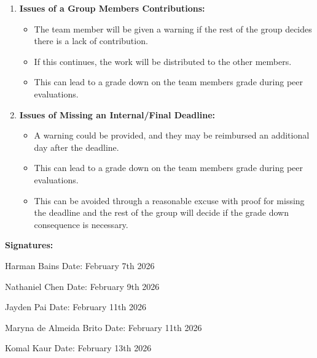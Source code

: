 \documentclass[10pt,letterpaper]{article}
\begin{document}
\begin{enumerate}
\item \textbf{Issues of a Group Members Contributions:}
      \begin{itemize}[leftmargin=*]
      \item The team member will be given a warning if the rest of the group decides there is a lack of contribution.
      \item If this continues, the work will be distributed to the other members.
      \item This can lead to a grade down on the team members grade during peer evaluations.
      \end{itemize}

\item \textbf{Issues of Missing an Internal/Final Deadline:}
      \begin{itemize}[leftmargin=*]
      \item A warning could be provided, and they may be reimbursed an additional day after the deadline.
      \item This can lead to a grade down on the team members grade during peer evaluations.
      \item This can be avoided through a reasonable excuse with proof for missing the deadline and the rest of the group will decide if the grade down consequence is necessary.
      \end{itemize}

\end{enumerate}

\vspace{1em}


\textbf{Signatures:}

\vspace{0em}

Harman Bains \hrulefill \quad Date: February 7th 2026 \hrulefill

\vspace{0em}

Nathaniel Chen \hrulefill \quad Date: February 9th 2026 \hrulefill

\vspace{0em}

Jayden Pai \hrulefill \quad Date: February 11th 2026 \hrulefill

\vspace{0em}

Maryna de Almeida Brito \hrulefill \quad Date: February 11th 2026 \hrulefill

\vspace{0em}
Komal Kaur \hrulefill \quad Date: February 13th 2026 \hrulefill
\end{document}
